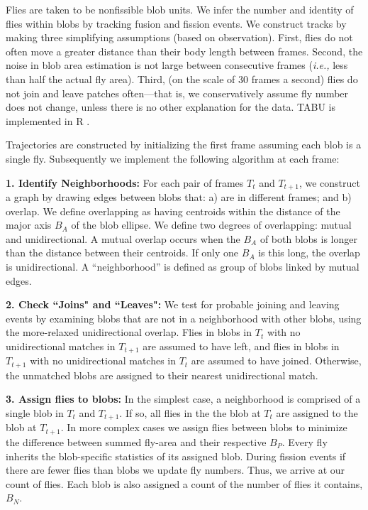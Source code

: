 \documentclass[11pt]{article}
\begin{document}
{\vspace*{0.05in}
 Flies are taken to be nonfissible blob units. We infer the number and identity of flies within blobs by tracking fusion and fission events. We construct tracks by making three simplifying assumptions (based on observation). First, flies do not often move a greater distance than their body length between frames. Second, the noise in blob area estimation is not large between consecutive frames (\emph{i.e.,} less than half the actual fly area). Third, (on the scale of 30 frames a second) flies do not join and leave patches often---that is, we conservatively assume fly number does not change, unless there is no other explanation for the data. TABU is implemented in R \cite{R}.

Trajectories are constructed by initializing the first frame assuming each blob is a single fly. Subsequently we implement the following algorithm at each frame:


 \textbf{1. Identify Neighborhoods:} For each pair of frames $T_{t}$ and $T_{t+1}$, we construct a graph by drawing edges between blobs that: a) are in different frames; and b) overlap. We define overlapping as having centroids within the distance of the major axis $B_A$ of the blob ellipse. We define two degrees of overlapping: mutual and unidirectional. A mutual overlap occurs when the $B_A$ of both blobs is longer than the distance between their centroids. If only one $B_A$ is this long, the overlap is unidirectional. A ``neighborhood'' is defined as group of blobs linked by mutual edges.

 \textbf{2. Check ``Joins" and ``Leaves":} We test for probable joining and leaving events by examining blobs that are not in a neighborhood with other blobs, using the more-relaxed unidirectional overlap. Flies in blobs in $T_{t}$ with no unidirectional matches in $T_{t+1}$ are assumed to have left, and flies in blobs in $T_{t+1}$ with no unidirectional matches in $T_{t}$ are assumed to have joined. Otherwise, the unmatched blobs are assigned to their nearest unidirectional match.

 \textbf{3. Assign flies to blobs:} In the simplest case, a neighborhood is comprised of a single blob in $T_t$ and $T_{t+1}$. If so, all flies in the the blob at $T_t$ are assigned to the blob at $T_{t+1}$. In more complex cases we assign flies between blobs to minimize the difference between summed fly-area and their respective $B_P$. Every fly inherits the blob-specific statistics of its assigned blob. During fission events if there are fewer flies than blobs we update fly numbers. Thus, we arrive at our count of flies. Each blob is also assigned a count of the number of flies it contains, $B_N$.

}
\end{document}

